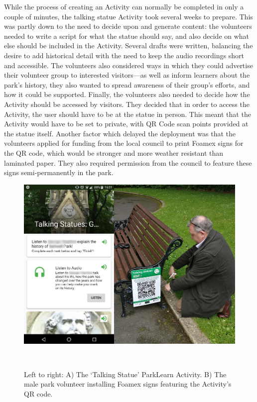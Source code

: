 While the process of creating an Activity can normally be completed in only a couple of minutes, the talking statue Activity took several weeks to prepare. This was partly down to the need to decide upon and generate content: the volunteers needed to write a script for what the statue should say, and also decide on what else should be included in the Activity. Several drafts were written, balancing the desire to add historical detail with the need to keep the audio recordings short and accessible. The volunteers also considered ways in which they could advertise their volunteer group to interested visitors---as well as inform learners about the park's history, they also wanted to spread awareness of their group's efforts, and how it could be supported. Finally, the volunteers also needed to decide how the Activity should be accessed by visitors. They decided that in order to access the Activity, the user should have to be at the statue in person. This meant that the Activity would have to be set to private, with QR Code scan points provided at the statue itself. Another factor which delayed the deployment was that the volunteers applied for funding from the local council to print Foamex signs for the QR code, which would be stronger and more weather resistant than laminated paper. They also required permission from the council to feature these signs semi-permanently in the park.

\begin{figure}
  \centering
  \includegraphics[width=0.8\columnwidth]{images/chapter06/TalkingStatue2.jpg}
  \caption[The ParkLearn `Talking Statue' Activity, and installing the signage ]{Left to right: A) The `Talking Statue' ParkLearn Activity. B) The male park volunteer installing Foamex signs featuring the Activity's QR code.}~\label{fig:TalkingStatueActivity}
\end{figure}

